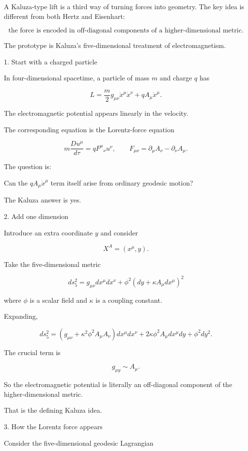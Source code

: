 A Kaluza-type lift is a third way of turning forces into geometry. The key idea is different from both Hertz and Eisenhart:

$$ \boxed{\text{the force is encoded in off-diagonal components of a higher-dimensional metric}.} $$

The prototype is Kaluza's five-dimensional treatment of electromagnetism.

1. Start with a charged particle

In four-dimensional spacetime, a particle of mass \(m\) and charge \(q\) has

$$ L = \frac{m}{2}g_{\mu\nu}\dot x^\mu\dot x^\nu + q A_\mu\dot x^\mu . $$

The electromagnetic potential appears linearly in the velocity.

The corresponding equation is the Lorentz-force equation

$$ m\frac{D u^\mu}{d\tau} = q F^\mu{}_{\nu}u^\nu, \qquad F_{\mu\nu} = \partial_\mu A_\nu-\partial_\nu A_\mu . $$

The question is:

Can the \(qA_\mu\dot x^\mu\) term itself arise from ordinary geodesic motion?

The Kaluza answer is yes.

2. Add one dimension

Introduce an extra coordinate \(y\) and consider

$$ X^A=(x^\mu,y). $$

Take the five-dimensional metric

$$ \boxed{ ds_5^2 = g_{\mu\nu}dx^\mu dx^\nu + \phi^2 \left(dy+\kappa A_\mu dx^\mu\right)^2 } $$

where \(\phi\) is a scalar field and \(\kappa\) is a coupling constant.

Expanding,

$$ ds_5^2 = \left(g_{\mu\nu} +\kappa^2\phi^2 A_\mu A_\nu\right)dx^\mu dx^\nu + 2\kappa\phi^2A_\mu dx^\mu dy + \phi^2dy^2 . $$

The crucial term is

$$ \boxed{ g_{\mu y}\sim A_\mu. } $$

So the electromagnetic potential is literally an off-diagonal component of the higher-dimensional metric.

That is the defining Kaluza idea.

3. How the Lorentz force appears

Consider the five-dimensional geodesic Lagrangian


